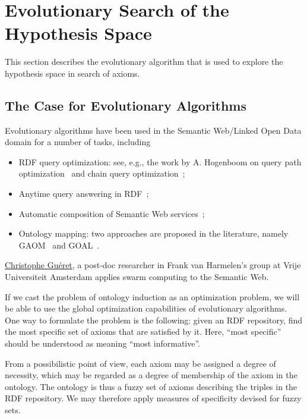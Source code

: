 \documentclass[a4paper]{article}
\newcounter{ex}
\begin{document}
\section{Evolutionary Search of the Hypothesis Space}
\label{EA}

This section describes the evolutionary algorithm that is used to explore
the hypothesis space in search of axioms.

\subsection{The Case for Evolutionary Algorithms}

Evolutionary algorithms have been used in the Semantic Web/Linked Open Data domain
for a number of tasks, including
\begin{itemize}
\item RDF query optimization: see, e.g., the work by A. Hogenboom on
  query path optimization~\cite{HogenboomMileaFrasincarKaymak2008}
  and chain query optimization~\cite{HogenboomMileaFrasincarKaymak2009};
\item Anytime query answering in RDF~\cite{OrenGueretSchlobach2008};
\item Automatic composition of Semantic Web services~\cite{BatoucheNaudetGuinand2010};
\item Ontology mapping: two approaches are proposed in the literature, namely
  GAOM~\cite{WangDingJiang2006} and GOAL~\cite{MartinezGilAlbaMontes2008}.
\end{itemize}

\href{http://www.few.vu.nl/~cgueret/}{Christophe Gu\'eret}, a post-doc researcher in Frank van Harmelen's group at Vrije
Universiteit Amsterdam applies swarm computing to the Semantic Web.

If we cast the problem of ontology induction as an optimization problem,
we will be able to use the global optimization capabilities of evolutionary algorithms.
One way to formulate the problem is the following: given an RDF repository,
find the most specific set of axioms that are satisfied by it.
Here, ``most specific'' should be understood as meaning ``most informative''.

From a possibilistic point of view, each axiom may be assigned a degree of necessity,
which may be regarded as a degree of membership of the axiom in the ontology.
The ontology is thus a fuzzy set of axioms describing the triples in the RDF repository.
We may therefore apply measures of specificity devised for fuzzy sets.
\end{document}
